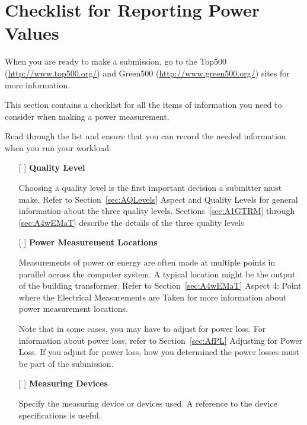 \chapter{Checklist for Reporting Power Values}
\label{sec:checklist}

\noindent
When you are ready to make a submission, go to the Top500 
(\url{http://www.top500.org/}) 
and Green500 (\url{http://www.green500.org/}) sites for more information. 
\wl

\noindent
This section contains a checklist for all the items of information you need 
to consider when making a power measurement. 
\wl

\noindent
Read through the list and ensure that you can record the needed 
information when you run your workload.
\wl

\begin{itemize}
\item[{[ ]}]
\textbf{Quality Level}

Choosing a quality level is the first important decision a submitter must make. Refer to 
Section~\ref{sec:AQLevels} Aspect and Quality Levels for general information about the three quality levels.  
Sections~\ref{sec:A1GTRM} through \ref{sec:A4wEMaT} describe the details of the three quality levels

\item[{[ ]}]
\textbf{Power Measurement Locations}

Measurements of power or energy are often made at multiple points in parallel across the computer system. A typical location might be the output of the building transformer.
Refer to Section~\ref{sec:A4wEMaT} Aspect 4: Point where the Electrical Measurements are Taken 
for more information about power measurement locations.

Note that in some cases, you may have to adjust for power loss. For information about power loss, refer to 
Section~\ref{sec:AfPL} Adjusting for Power Loss.  If you adjust for power loss, how you determined the power losses must be part of the submission.


\newpage

\item[{[ ]}]
\textbf{Measuring Devices}

Specify the measuring device or devices used. A reference to the device specifications is useful.


\end{itemize}
